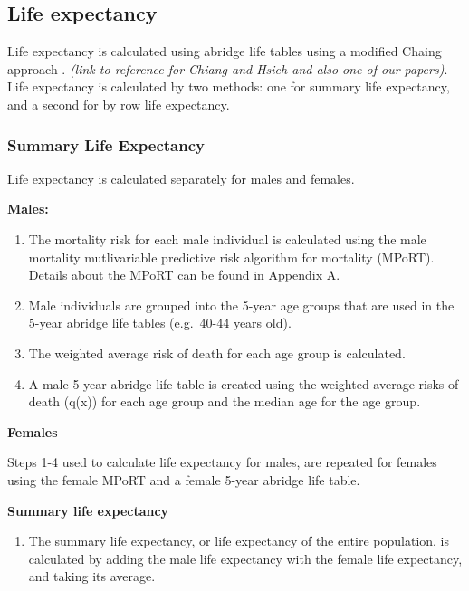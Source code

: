 \documentclass[]{book}
\providecommand{\tightlist}{%
  \setlength{\itemsep}{0pt}\setlength{\parskip}{0pt}}
\begin{document}
\subsection{Life expectancy}\label{life-expectancy}

Life expectancy is calculated using abridge life tables using a modified
Chaing approach \citep{Chiang} \citep{Hsieh}. \emph{(link to reference
for Chiang and Hsieh and also one of our papers)}. Life expectancy is
calculated by two methods: one for summary life expectancy, and a second
for by row life expectancy.

\subsubsection{Summary Life Expectancy}\label{summary-life-expectancy}

Life expectancy is calculated separately for males and females.

\textbf{Males:}

\begin{enumerate}
\def\labelenumi{\arabic{enumi}.}
\item
  The mortality risk for each male individual is calculated using the
  male mortality mutlivariable predictive risk algorithm for mortality
  (MPoRT). Details about the MPoRT can be found in Appendix A.
\item
  Male individuals are grouped into the 5-year age groups that are used
  in the 5-year abridge life tables (e.g.~40-44 years old).
\item
  The weighted average risk of death for each age group is calculated.
\item
  A male 5-year abridge life table is created using the weighted average
  risks of death (q(x)) for each age group and the median age for the
  age group.
\end{enumerate}

\textbf{Females}

Steps 1-4 used to calculate life expectancy for males, are repeated for
females using the female MPoRT and a female 5-year abridge life table.

\textbf{Summary life expectancy}

\begin{enumerate}
\def\labelenumi{\arabic{enumi}.}
\setcounter{enumi}{4}
\tightlist
\item
  The summary life expectancy, or life expectancy of the entire
  population, is calculated by adding the male life expectancy with the
  female life expectancy, and taking its average.
\end{enumerate}
\end{document}
